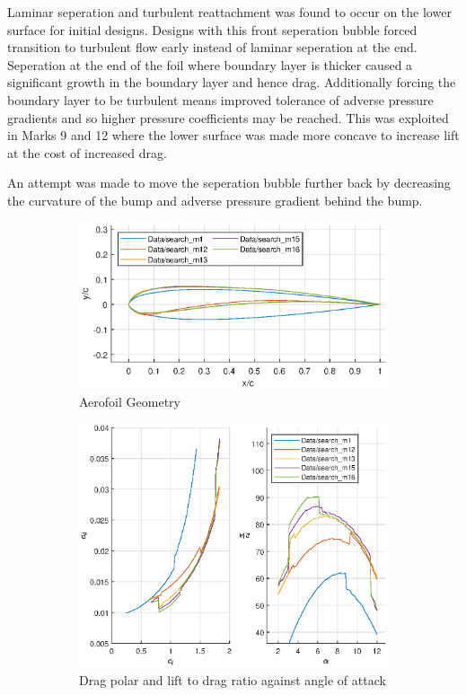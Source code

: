\documentclass{article}
\begin{document}
Laminar seperation and turbulent reattachment was found to occur on the lower surface for initial designs.
Designs with this front seperation bubble forced transition to turbulent flow early instead of laminar seperation at the end.
Seperation at the end of the foil where boundary layer is thicker caused a significant growth in the boundary layer and hence drag.
Additionally forcing the boundary layer to be turbulent means improved tolerance of adverse pressure gradients and so higher pressure coefficients may be reached.
This was exploited in Marks 9 and 12 where the lower surface was made more concave to increase lift at the cost of increased drag.

An attempt was made to move the seperation bubble further back by decreasing the curvature of the bump and adverse pressure gradient behind the bump.

\begin{figure}[H]
    \begin{subfigure}{0.54\textwidth}
        \centering
        \includegraphics[width=1.2\textwidth, center]{figures/loRe_geometry_16.eps}
        \caption{Aerofoil Geometry}
        \label{fig:m16_geometry}
    \end{subfigure}
    \begin{subfigure}{0.45\textwidth}
        \centering
        \includegraphics[width=1.2\textwidth, center]{figures/loRe_lod_16.eps}
        \caption{Drag polar and lift to drag ratio against angle of attack}
        \label{fig:m16_lod}
    \end{subfigure}
    \caption{}
\end{figure}
\end{document}
